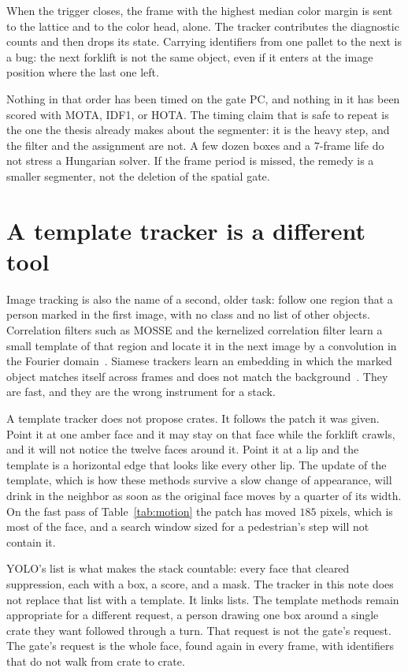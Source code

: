 \documentclass[11pt,a4paper]{article}
\begin{document}
When the trigger closes, the frame with the highest median color margin is sent to the lattice and to the color head, alone. The tracker contributes the diagnostic counts and then drops its state. Carrying identifiers from one pallet to the next is a bug: the next forklift is not the same object, even if it enters at the image position where the last one left.

Nothing in that order has been timed on the gate PC, and nothing in it has been scored with MOTA, IDF1, or HOTA. The timing claim that is safe to repeat is the one the thesis already makes about the segmenter: it is the heavy step, and the filter and the assignment are not. A few dozen boxes and a $7$-frame life do not stress a Hungarian solver. If the frame period is missed, the remedy is a smaller segmenter, not the deletion of the spatial gate.

\section{A template tracker is a different tool}

Image tracking is also the name of a second, older task: follow one region that a person marked in the first image, with no class and no list of other objects. Correlation filters such as MOSSE and the kernelized correlation filter learn a small template of that region and locate it in the next image by a convolution in the Fourier domain~\cite{bolme2010mosse,henriques2015kcf}. Siamese trackers learn an embedding in which the marked object matches itself across frames and does not match the background~\cite{bertinetto2016siamfc}. They are fast, and they are the wrong instrument for a stack.

A template tracker does not propose crates. It follows the patch it was given. Point it at one amber face and it may stay on that face while the forklift crawls, and it will not notice the twelve faces around it. Point it at a lip and the template is a horizontal edge that looks like every other lip. The update of the template, which is how these methods survive a slow change of appearance, will drink in the neighbor as soon as the original face moves by a quarter of its width. On the fast pass of Table~\ref{tab:motion} the patch has moved $185$ pixels, which is most of the face, and a search window sized for a pedestrian's step will not contain it.

YOLO's list is what makes the stack countable: every face that cleared suppression, each with a box, a score, and a mask. The tracker in this note does not replace that list with a template. It links lists. The template methods remain appropriate for a different request, a person drawing one box around a single crate they want followed through a turn. That request is not the gate's request. The gate's request is the whole face, found again in every frame, with identifiers that do not walk from crate to crate.
\end{document}
